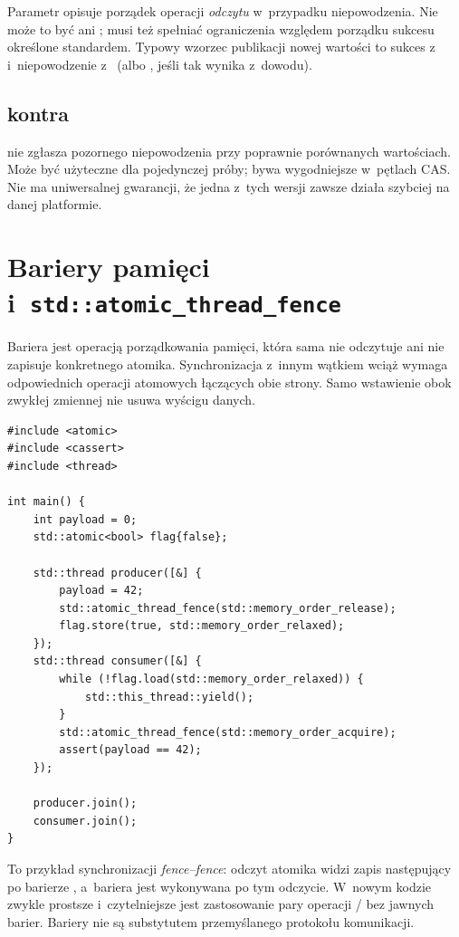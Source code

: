 Parametr  opisuje porządek operacji \emph{odczytu}
w~przypadku niepowodzenia. Nie może to być  ani
; musi też spełniać ograniczenia względem porządku
sukcesu określone standardem. Typowy wzorzec publikacji nowej
wartości to sukces z~ i~niepowodzenie z~
(albo , jeśli tak wynika z~dowodu).

\subsection{ kontra }

 nie zgłasza pozornego niepowodzenia
przy poprawnie porównanych wartościach. Może być użyteczne dla
pojedynczej próby;  bywa wygodniejsze w~pętlach CAS.
Nie ma uniwersalnej gwarancji, że jedna z~tych wersji zawsze działa
szybciej na danej platformie.

\section{Bariery pamięci i~\texttt{std::atomic\_thread\_fence}}
\label{sec:cpp16-fences}

Bariera  jest operacją
porządkowania pamięci, która sama nie odczytuje ani nie zapisuje
konkretnego atomika. Synchronizacja z~innym wątkiem wciąż wymaga
odpowiednich operacji atomowych łączących obie strony. Samo
wstawienie  obok zwykłej zmiennej nie usuwa wyścigu danych.

\begin{lstlisting}[caption={Publikacja ze zwolnieniową i~przejmującą barierą pamięci (C++11).}]
#include <atomic>
#include <cassert>
#include <thread>

int main() {
    int payload = 0;
    std::atomic<bool> flag{false};

    std::thread producer([&] {
        payload = 42;
        std::atomic_thread_fence(std::memory_order_release);
        flag.store(true, std::memory_order_relaxed);
    });
    std::thread consumer([&] {
        while (!flag.load(std::memory_order_relaxed)) {
            std::this_thread::yield();
        }
        std::atomic_thread_fence(std::memory_order_acquire);
        assert(payload == 42);
    });

    producer.join();
    consumer.join();
}
\end{lstlisting}

To przykład synchronizacji \emph{fence--fence}: odczyt atomika
widzi zapis następujący po barierze , a~bariera
 jest wykonywana po tym odczycie. W~nowym kodzie
zwykle prostsze i~czytelniejsze jest zastosowanie pary operacji
/ bez jawnych barier. Bariery nie są
substytutem przemyślanego protokołu komunikacji.

